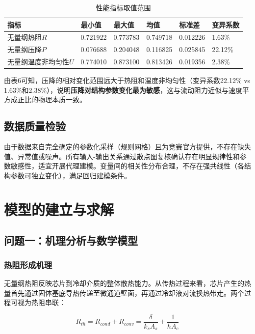 \documentclass[12pt,a4paper]{ctexart}
\begin{document}
\begin{table}[H]
\centering
\caption{性能指标取值范围}
\footnotesize
\begin{tabular}{p{}p{}p{}p{}p{}p{}}
\toprule
指标 & 最小值 & 最大值 & 均值 & 标准差 & 变异系数 \\
\midrule
无量纲热阻$R$ & 0.721922 & 0.773783 & 0.749718 & 0.012226 & 1.63\% \\
无量纲压降$P$ & 0.076688 & 0.204048 & 0.116825 & 0.025845 & 22.12\% \\
无量纲温度非均匀性$U$ & 0.774010 & 0.873100 & 0.813426 & 0.019356 & 2.38\% \\
\bottomrule
\end{tabular}
\end{table}

由表6可知，压降的相对变化范围远大于热阻和温度非均匀性（变异系数22.12\% vs 1.63\%和2.38\%），说明\textbf{压降对结构参数变化最为敏感}，这与流动阻力近似与速度平方成正比的物理本质一致。

\subsection{数据质量检验}

由于数据来自完全确定的参数化采样（规则网格）且为竞赛官方提供，不存在缺失值、异常值或噪声。所有输入-输出关系通过散点图复核确认存在明显规律性和参数敏感性，适宜开展代理建模。变量间的相关性分布合理，不存在强共线性（各结构参数可独立变化），满足回归建模条件。

\section{模型的建立与求解}

\subsection{问题一：机理分析与数学模型}

\subsubsection{热阻形成机理}

无量纲热阻反映芯片到冷却介质的整体散热能力。从传热过程来看，芯片产生的热量首先通过固体基底导热传递至微通道壁面，再通过冷却液对流换热带走。两个过程可视为热阻串联：

\begin{equation}
R_{th} = R_{cond} + R_{conv} = \frac{\delta}{k_s A_s} + \frac{1}{h A_c}
\end{equation}
\end{document}
